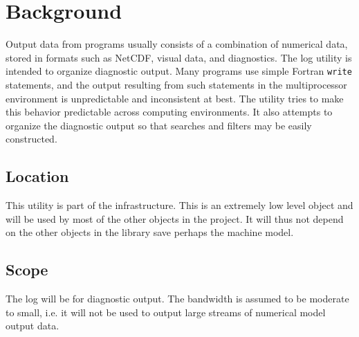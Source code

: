 

\section{Background}

Output data from programs usually consists of a combination of numerical data,
stored in formats such as NetCDF, visual data, and diagnostics.  The log 
utility is intended to organize diagnostic output.  Many programs use simple 
Fortran {\tt write} statements, and the output resulting from such statements
in the multiprocessor environment is unpredictable and inconsistent at best.  
The utility tries to make this behavior predictable across computing 
environments.  It also attempts to organize the diagnostic output so that 
searches and filters may be easily constructed.

\subsection{Location}

This utility is part of the infrastructure.  This is an extremely low level 
object and will be used by most of the other objects in the project.  It will 
thus not depend on the other objects in the library save perhaps the machine 
model.

\subsection{Scope}

The log will be for diagnostic output.  The bandwidth is assumed to be moderate
to small, i.e. it will not be used to output large streams of numerical model 
output data.  



